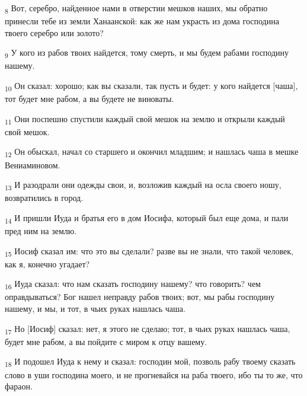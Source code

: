 \begin{tcolorbox}
\textsubscript{8} Вот, серебро, найденное нами в отверстии мешков наших, мы обратно принесли тебе из земли Ханаанской: как же нам украсть из дома господина твоего серебро или золото?
\end{tcolorbox}
\begin{tcolorbox}
\textsubscript{9} У кого из рабов твоих найдется, тому смерть, и мы будем рабами господину нашему.
\end{tcolorbox}
\begin{tcolorbox}
\textsubscript{10} Он сказал: хорошо; как вы сказали, так пусть и будет: у кого найдется [чаша], тот будет мне рабом, а вы будете не виноваты.
\end{tcolorbox}
\begin{tcolorbox}
\textsubscript{11} Они поспешно спустили каждый свой мешок на землю и открыли каждый свой мешок.
\end{tcolorbox}
\begin{tcolorbox}
\textsubscript{12} Он обыскал, начал со старшего и окончил младшим; и нашлась чаша в мешке Вениаминовом.
\end{tcolorbox}
\begin{tcolorbox}
\textsubscript{13} И разодрали они одежды свои, и, возложив каждый на осла своего ношу, возвратились в город.
\end{tcolorbox}
\begin{tcolorbox}
\textsubscript{14} И пришли Иуда и братья его в дом Иосифа, который был еще дома, и пали пред ним на землю.
\end{tcolorbox}
\begin{tcolorbox}
\textsubscript{15} Иосиф сказал им: что это вы сделали? разве вы не знали, что такой человек, как я, конечно угадает?
\end{tcolorbox}
\begin{tcolorbox}
\textsubscript{16} Иуда сказал: что нам сказать господину нашему? что говорить? чем оправдываться? Бог нашел неправду рабов твоих; вот, мы рабы господину нашему, и мы, и тот, в чьих руках нашлась чаша.
\end{tcolorbox}
\begin{tcolorbox}
\textsubscript{17} Но [Иосиф] сказал: нет, я этого не сделаю; тот, в чьих руках нашлась чаша, будет мне рабом, а вы пойдите с миром к отцу вашему.
\end{tcolorbox}
\begin{tcolorbox}
\textsubscript{18} И подошел Иуда к нему и сказал: господин мой, позволь рабу твоему сказать слово в уши господина моего, и не прогневайся на раба твоего, ибо ты то же, что фараон.
\end{tcolorbox}
